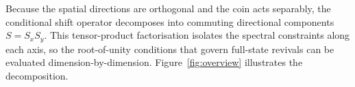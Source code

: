 Because the spatial directions are orthogonal and the coin acts
separably, the conditional shift operator decomposes into commuting
directional components $S = S_x S_y$. This tensor-product factorisation
isolates the spectral constraints along each axis, so the root-of-unity
conditions that govern full-state revivals can be evaluated
dimension-by-dimension. Figure~\ref{fig:overview} illustrates the
decomposition.
